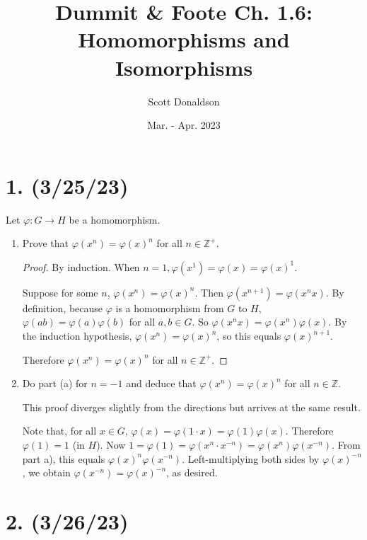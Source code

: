 \documentclass{article}
\title{Dummit \& Foote Ch. 1.6: Homomorphisms and Isomorphisms}
\author{Scott Donaldson}
\date{Mar. - Apr. 2023}
\begin{document}
\maketitle

\section*{1. (3/25/23)}

Let $\varphi: G \rightarrow H$ be a homomorphism.

\begin{enumerate}[label=(\alph*)]
    \item Prove that $\varphi(x^n) = \varphi(x)^n$ for all $n \in \mathbb{Z}^+$.
          \begin{proof}
            By induction. When $n = 1, \varphi(x^1) = \varphi(x) = \varphi(x)^1$.

            Suppose for some $n$, $\varphi(x^n) = \varphi(x)^n$. Then $\varphi(x^{n + 1}) = \varphi(x^n x)$. By definition, because $\varphi$ is a homomorphism from $G$ to $H$, $\varphi(ab) = \varphi(a)\varphi(b)$ for all $a, b \in G$. So $\varphi(x^n x) = \varphi(x^n) \varphi(x)$. By the induction hypothesis, $\varphi(x^n) = \varphi(x)^n$, so this equals $\varphi(x)^{n + 1}$.

            Therefore $\varphi(x^n) = \varphi(x)^n$ for all $n \in \mathbb{Z}^+$.
          \end{proof}

    \item Do part (a) for $n = -1$ and deduce that $\varphi(x^n) = \varphi(x)^n$ for all $n \in \mathbb{Z}$.
    
          This proof diverges slightly from the directions but arrives at the same result.
          
          Note that, for all $x \in G$, $\varphi(x) = \varphi(1 \cdot x) = \varphi(1) \varphi(x)$. Therefore $\varphi(1) = 1$ (in $H$). Now $1 = \varphi(1) = \varphi(x^n \cdot x^{-n}) = \varphi(x^n) \varphi(x^{-n})$. From part a), this equals $\varphi(x)^n \varphi(x^{-n})$. Left-multiplying both sides by $\varphi(x)^{-n}$, we obtain $\varphi(x^{-n}) = \varphi(x)^{-n}$, as desired.
          
\end{enumerate}

\section*{2. (3/26/23)}
\end{document}
